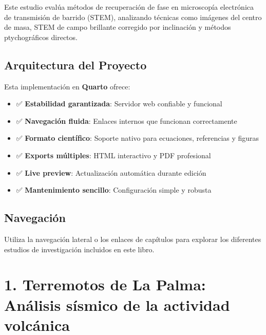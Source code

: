 \documentclass[
  spanish,
  letterpaper,
]{book}
\providecommand{\tightlist}{%
  \setlength{\itemsep}{0pt}\setlength{\parskip}{0pt}}
\begin{document}

Este estudio evalúa métodos de recuperación de fase en microscopía
electrónica de transmisión de barrido (STEM), analizando técnicas como
imágenes del centro de masa, STEM de campo brillante corregido por
inclinación y métodos ptychográficos directos.

\section*{Arquitectura del Proyecto}\label{arquitectura-del-proyecto}


Esta implementación en \textbf{Quarto} ofrece:

\begin{itemize}
\tightlist
\item
  ✅ \textbf{Estabilidad garantizada}: Servidor web confiable y
  funcional
\item
  ✅ \textbf{Navegación fluida}: Enlaces internos que funcionan
  correctamente
\item
  ✅ \textbf{Formato científico}: Soporte nativo para ecuaciones,
  referencias y figuras
\item
  ✅ \textbf{Exports múltiples}: HTML interactivo y PDF profesional
\item
  ✅ \textbf{Live preview}: Actualización automática durante edición
\item
  ✅ \textbf{Mantenimiento sencillo}: Configuración simple y robusta
\end{itemize}

\section*{Navegación}\label{navegaciuxf3n}


Utiliza la navegación lateral o los enlaces de capítulos para explorar
los diferentes estudios de investigación incluidos en este libro.


\chapter{1. Terremotos de La Palma: Análisis sísmico de la actividad
volcánica}\label{terremotos-de-la-palma-anuxe1lisis-suxedsmico-de-la-actividad-volcuxe1nica}
\end{document}
